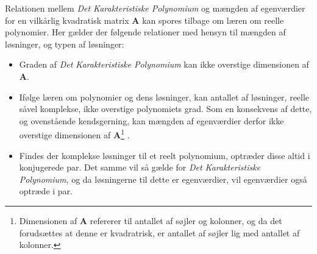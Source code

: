 \documentclass{article}
\begin{document}
	Relationen mellem \textit{Det Karakteristiske Polynomium} og mængden af egenværdier for en vilkårlig kvadratisk matrix \textbf{A} kan spores tilbage om læren om reelle polynomier. Her gælder der følgende relationer med hensyn til mængden af løsninger, og typen af løsninger:
	\begin{itemize}
		\item Graden af \textit{Det Karakteristiske Polynomium} kan ikke overstige dimensionen af \textbf{A}.
		\item Ifølge læren om polynomier og dens løsninger, kan antallet af løsninger, reelle såvel komplekse, ikke overstige polynomiets grad. Som en konsekvens af dette, og ovenstående kendsgerning, kan mængden af egenværdier derfor ikke overstige dimensionen af \textbf{A}\footnote{Dimensionen af \textbf{A} refererer til antallet af søjler og kolonner, og da det forudsættes at denne er kvadratrisk, er antallet af søjler lig med antallet af kolonner.} .
		\item Findes der komplekse løsninger til et reelt polynomium, optræder disse altid i konjugerede par. Det samme vil så gælde for \textit{Det Karakteristiske Polynomium}, og da løsningerne til dette er egenværdier, vil egenværdier også optræde i par.
	\end{itemize}
	
	
\end{document}
